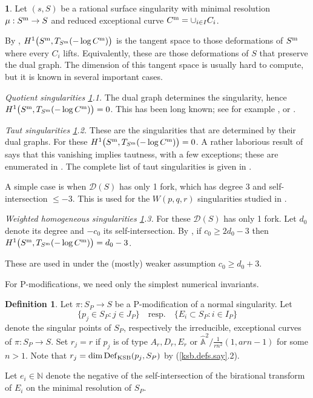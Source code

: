 \documentclass{amsart}
\theoremstyle{definition}
\newtheorem{defn}[thm]{Definition}
\newtheorem{say}[thm]{}
\theoremstyle{remark}
\newcommand{\n}[0]{{\mathbb N}}
\renewcommand{\a}[0]{\hat{\mathbb A}}
\newcommand{\qtq}[1]{\quad\mbox{#1}\quad}
\newcommand{\defsp}[0]{\operatorname{Def}}
\begin{document}
\begin{say}
  \label{taut.defn}
Let  $(s, S)$ be a rational surface singularity with  
 minimal resolution  $\mu:S^{\rm m}\to S$ and  reduced exceptional curve
$C^{\rm m}=\cup_{i\in I} C_i$.

By \cite[Sec.3.4.4]{sernesi}, $H^1\bigl(S^{\rm m}, T_{S^{\rm m}}(-\log C^{\rm m})\bigr)$
is the tangent space to those deformations of $S^{\rm m}$ where every $C_i$ lifts. Equivalently, these are  those deformations of $S$ that preserve the dual graph.  The dimension of this tangent space is usually hard to compute, but it is known in several important cases.

\medskip
{\it Quotient singularities \ref{taut.defn}.1.} The dual graph determines
the singularity, hence $H^1\bigl(S^{\rm m}, T_{S^{\rm m}}(-\log C^{\rm m})\bigr)=0$.
This has been long known; see for example \cite{briesk},
  \cite[III.5.1]{bpv} or 
  \cite[3.32]{kk-singbook}.

  \medskip
      {\it Taut singularities \ref{taut.defn}.2.} These are the singularities that are determined by their dual graphs.
      For these $H^1\bigl(S^{\rm m}, T_{S^{\rm m}}(-\log C^{\rm m})\bigr)=0$.
      A rather laborious result of \cite{MR367277, MR333238} says that
 this vanishing implies tautness,  with a few exceptions; these are enumerated in \cite[3.2]{MR333238}.
 The   complete list of taut singularities is given in \cite{MR333238}.

 A simple case is when  ${\mathcal D}(S)$ has only 1 fork, which has  degree 3 and self-intersection $\leq -3$. This is  used for the  $W(p,q,r)$ singularities studied in \cite{park2022deformations}.

   \medskip
       {\it Weighted homogeneous singularities \ref{taut.defn}.3.}
       For these  ${\mathcal D}(S)$ has only 1 fork. Let $d_0$ denote its   degree  and  $-c_0$ its self-intersection.  By \cite[4.1.III]{MR333238}, if
       $c_0\geq 2d_0-3$ then
       $H^1\bigl(S^{\rm m}, T_{S^{\rm m}}(-\log C^{\rm m})\bigr)=d_0-3$.

        These are used
        in \cite{jeon2023deformations} under the (mostly) weaker assumption
        $c_0\geq d_0+3$.
\end{say}

For  P-modifications, we need only the simplest numerical 
invariants.




\begin{defn}\label{I.J.P.mod.defn}   Let  $\pi:S_P\to S$ be a
  P-modification of a normal singularity. Let
$$
\{p_j\in S_P: j\in J_P\} \qtq{resp.} \{E_i\subset S_P: i\in I_P\}
$$
 denote the singular points of $S_P$, respectively
 the irreducible, exceptional curves of $\pi:S_P\to S$.
 Set $r_j=r$ if $p_j$ is of type $A_r, D_r, E_r$  or 
 $\a^2/\tfrac1{rn^2}(1, arn{-}1)$ for some $n>1$.
Note that $r_j=\dim \defsp_{\rm KSB}(p_j,S_P)$ by (\ref{ksb.defs.say}.2).
 
Let $e_i\in \n$ denote the negative of the self-intersection of the
birational transform of $E_i$ on the minimal resolution of $S_P$.
\end{defn}
\end{document}

